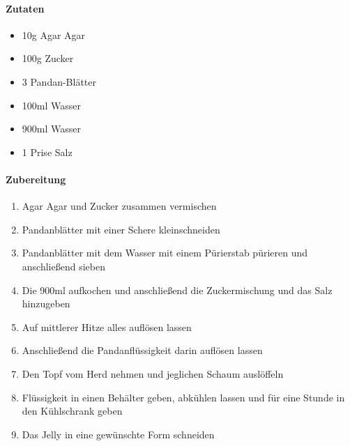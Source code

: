\clearpage
{}
\label{PandanJelly}
\paragraph{Zutaten}
\begin{itemize}[noitemsep]
	\item 10g Agar Agar 
	\item 100g Zucker
	\item 3 Pandan-Blätter
	\item 100ml Wasser
	\item 900ml Wasser
	\item 1 Prise Salz
\end{itemize}


\paragraph{Zubereitung}
\begin{enumerate}[noitemsep]
	\item Agar Agar und Zucker zusammen vermischen
	\item Pandanblätter mit einer Schere kleinschneiden 
	\item Pandanblätter mit dem Wasser mit einem Pürierstab pürieren und anschließend sieben
	\item Die 900ml aufkochen und anschließend die Zuckermischung und das Salz hinzugeben
	\item Auf mittlerer Hitze alles auflösen lassen
	\item Anschließend die Pandanflüssigkeit darin auflösen lassen
	\item Den Topf vom Herd nehmen und jeglichen Schaum auslöffeln
	\item Flüssigkeit in einen Behälter geben, abkühlen lassen und für eine Stunde in den Kühlschrank geben
	\item Das Jelly in eine gewünschte Form schneiden
\end{enumerate}